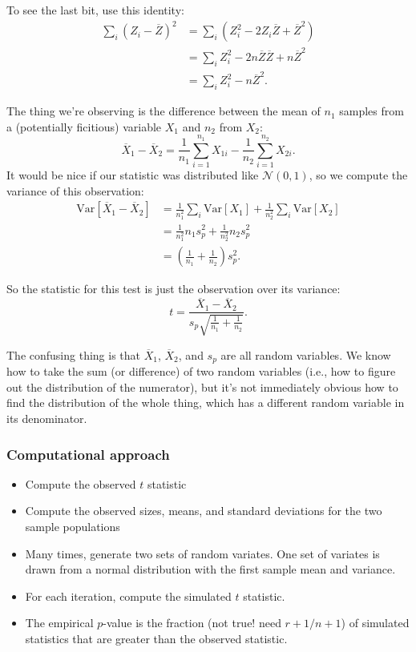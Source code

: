 To see the last bit, use this identity:
\begin{align}
\sum_i (Z_i - \overline{Z})^2 &= \sum_i (Z_i^2 - 2 Z_i \overline{Z} + \overline{Z}^2) \\
  &= \sum_i Z_i^2 - 2 n \overline{Z} \overline{Z} + n \overline{Z}^2 \\
  &= \sum_i Z_i^2 - n \overline{Z}^2.
\end{align}

The thing we're observing is the difference between the mean of \(n_1\)
samples from a (potentially ficitious) variable \(X_1\) and \(n_2\) from
\(X_2\): \[
\overline{X}_1 - \overline{X}_2 = \frac{1}{n_1} \sum_{i=1}^{n_1} X_{1i} - \frac{1}{n_2} \sum_{i=1}^{n_2} X_{2i}.
\] It would be nice if our statistic was distributed like
\(\mathcal{N}(0, 1)\), so we compute the variance of this observation:
\[
\begin{aligned}
\mathrm{Var}\left[ \overline{X}_1 - \overline{X}_2 \right]
  &= \frac{1}{n_1^2} \sum_i \mathrm{Var}[X_1] + \frac{1}{n_2^2} \sum_i \mathrm{Var}[X_2] \\
  &= \frac{1}{n_1^2} n_1 s_p^2 + \frac{1}{n_2^2} n_2 s_p^2 \\
  &= \left( \frac{1}{n_1} + \frac{1}{n_2} \right) s_p^2.
\end{aligned}
\]

So the statistic for this test is just the observation over its
variance: \[
t = \frac{\overline{X}_1 - \overline{X}_2}{s_p \sqrt{\frac{1}{n_1} + \frac{1}{n_2}}}.
\]

The confusing thing is that \(\overline{X}_1\), \(\overline{X}_2\), and
\(s_p\) are all random variables. We know how to take the sum (or
difference) of two random variables (i.e., how to figure out the
distribution of the numerator), but it's not immediately obvious how to
find the distribution of the whole thing, which has a different random
variable in its denominator.

\subsubsection{Computational approach}\label{computational-approach}

\begin{itemize}
\tightlist
\item
  Compute the observed \(t\) statistic
\item
  Compute the observed sizes, means, and standard deviations for the two
  sample populations
\item
  Many times, generate two sets of random variates. One set of variates
  is drawn from a normal distribution with the first sample mean and
  variance.
\item
  For each iteration, compute the simulated \(t\) statistic.
\item
  The empirical \(p\)-value is the fraction (not true! need \(r+1/n+1\))
  of simulated statistics that are greater than the observed statistic.
\end{itemize}

